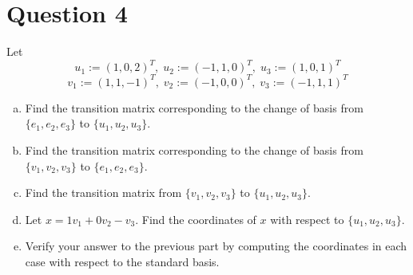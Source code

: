 \documentclass{article}
\begin{document}
\section*{Question 4}
Let
$$ u_1 := (1, 0 ,2)^T, \; u_2 := (-1, 1, 0)^T, \; u_3 := (1, 0, 1)^T $$
$$ v_1 := (1, 1, -1)^T, \; v_2 := (-1, 0, 0)^T, \; v_3 := (-1, 1, 1)^T $$
\begin{enumerate}[a.]
    \item Find the transition matrix corresponding to the change of basis from $\{e_1, e_2, e_3\}$ to $\{u_1, u_2, u_3\}$.
    \item Find the transition matrix corresponding to the change of basis from $\{v_1, v_2, v_3\}$ to $\{e_1, e_2, e_3\}$.
    \item Find the transition matrix from $\{v_1, v_2, v_3\}$ to $\{u_1, u_2, u_3\}$.
    \item Let $x = 1v_1 + 0v_2 - v_3$. Find the coordinates of $x$ with respect to $\{u_1, u_2, u_3\}$.
    \item Verify your answer to the previous part by computing the coordinates in each case with respect to the standard basis.
\end{enumerate}
\end{document}
